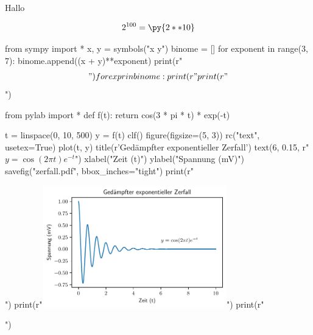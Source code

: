\documentclass[12pt,ngerman]{scrartcl}
\begin{document}
Hallo



\[
2^{100}=\py{2**10}
\]


\begin{pycode}
from sympy import *
x, y = symbols("x y")
binome = []
for exponent in range(3, 7):
    binome.append((x + y)**exponent)
    print(r"\begin{align*}")
    for expr in binome:
        print(r"%
    print(r"\end{align*}")
\end{pycode}

\begin{pycode}
from pylab import *
def f(t):
    return cos(3 * pi * t) * exp(-t)

t = linspace(0, 10, 500)
y = f(t)
clf()
figure(figsize=(5, 3))
rc("text", usetex=True)
plot(t, y)
title(r'Ged\"ampfter exponentieller Zerfall') 
text(6, 0.15, r"$y = \cos(2 \pi t) e^{-t}$")
xlabel("Zeit (t)")
ylabel("Spannung (mV)")
savefig("zerfall.pdf", bbox_inches="tight")
print(r"\begin{center}")
print(r"\includegraphics[width=0.6\textwidth]{zerfall.pdf}")
print(r"\end{center}")
\end{pycode}
\end{document}

